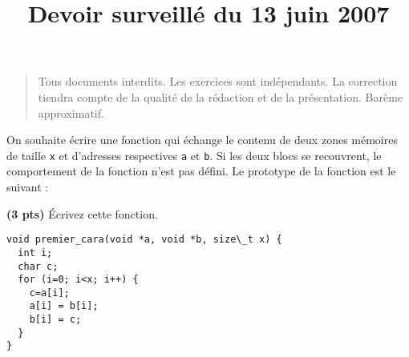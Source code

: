 \documentclass[10pt]{article}
\title{Devoir surveillé du 13 juin 2007}
\begin{document}
\maketitle
\thispagestyle{empty}

\begin{quote}
  Tous documents interdits. Les exercices sont indépendants. La correction
  tiendra compte de la qualité de la rédaction et de la présentation. Barème
  approximatif.
\end{quote}


\begin{Exercice} 
  On souhaite écrire une fonction qui échange le contenu de deux zones mémoires
  de taille \texttt{x} et d'adresses respectives \texttt{a} et \texttt{b}. Si
  les deux blocs se recouvrent, le comportement de la fonction n'est pas
  défini. Le prototype de la fonction est le suivant : 
  

\Question \textbf{(3 pts)} Écrivez cette fonction.

\begin{Reponse}
  \begin{Verbatim}
void premier_cara(void *a, void *b, size\_t x) {
  int i;
  char c;
  for (i=0; i<x; i++) {
    c=a[i];
    a[i] = b[i];
    b[i] = c;
  }
}
  \end{Verbatim}
\end{Reponse}
\end{Exercice}
\end{document}
